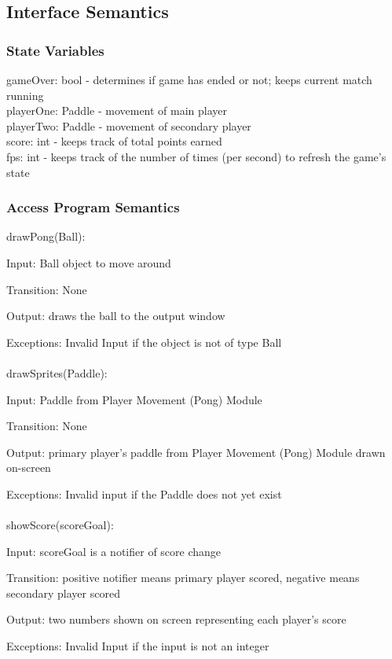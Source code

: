 \documentclass[12pt, titlepage]{article}
\begin{document}
		\subsection{Interface Semantics}
		\subsubsection{State Variables}
		gameOver: bool - determines if game has ended or not; keeps current match running \\
		playerOne: Paddle - movement of main player \\
		playerTwo: Paddle - movement of secondary player \\
		score: int - keeps track of total points earned \\
		fps: int - keeps track of the number of times (per second) to refresh the game's state
		
		\subsubsection{Access Program Semantics}
		
		drawPong(Ball):
		
		Input: Ball object to move around
		
		Transition: None
		
		Output: draws the ball to the output window
		
		Exceptions: Invalid Input if the object is not of type Ball\\
		\\
		drawSprites(Paddle):
		
		Input: Paddle from Player Movement (Pong) Module
		
		Transition: None
		
		Output: primary player's paddle from Player Movement (Pong) Module drawn on-screen
		
		Exceptions: Invalid input if the Paddle does not yet exist\\
		\\
		showScore(scoreGoal):
		
		Input: scoreGoal is a notifier of score change
		
		Transition: positive notifier means primary player scored, negative means secondary player scored
		
		Output: two numbers shown on screen representing each player's score
		
		Exceptions: Invalid Input if the input is not an integer
		
\end{document}
